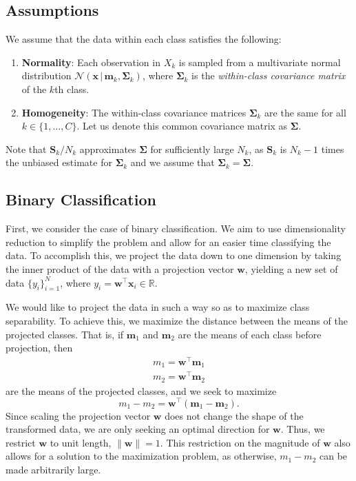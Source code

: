 \documentclass[letterpaper, 10 pt, conference]{ieeeconf}  %
\newcommand{\ve}[1]{\mathbf{#1}}
\begin{document}
\subsection{Assumptions}\label{subsec:mathform}
We assume that the data within each class satisfies the following:
\begin{enumerate}
    \item \textbf{Normality}: Each observation in $X_k$ is sampled from a multivariate normal distribution $\mathcal{N}(\ve{x}\,|\,\ve{m}_k, \ve{\Sigma}_k)$, where $\ve{\Sigma}_k$
    is the \textit{within-class covariance matrix} of the $k$th class.
    \item \textbf{Homogeneity}: The within-class covariance matrices $\ve{\Sigma}_k$ are the same for all $k \in \{1,\ldots,C\}$. Let us denote this common covariance matrix as $\ve{\Sigma}$.
\end{enumerate}
Note that $\ve{S}_k / N_k$ approximates $\ve{\Sigma}$ for sufficiently large $N_k$, as $\ve{S}_k$ is $N_k-1$ times the unbiased estimate for $\ve{\Sigma}_k$ and we assume that $\ve{\Sigma}_k = \ve{\Sigma}$.

\subsection{Binary Classification}\label{subsec:binclass}
First, we consider the case of binary classification. We aim to use dimensionality reduction to simplify the problem and allow for an easier time classifying the data. To accomplish this, we project the data down to one dimension by taking the inner product of the data with a projection vector $\ve{w}$, yielding a new set of data $\{y_i\}_{i=1}^{N}$, where $y_i=\ve{w}^\top \ve{x}_i \in \mathbb{R}$. 

We would like to project the data in such a way so as to maximize class separability. To achieve this, we maximize the distance between the means of the projected classes. 
That is, if $\ve{m}_1$ and $\ve{m}_2$ are the means of each class before projection, then 
\begin{align*}
    m_1=\ve{w}^\top \ve{m}_1 \\ m_2=\ve{w}^\top \ve{m}_2
\end{align*}
are the means of the projected classes, and we seek to maximize $$m_1-m_2=\ve{w}^\top (\ve{m}_1-\ve{m}_2).$$
Since scaling the projection vector $\ve{w}$ does not change the shape of the transformed data, we are only seeking an optimal direction for $\ve{w}$. Thus, we restrict $\ve{w}$ to unit length, $\|\ve{w}\|=1$. This restriction on the magnitude of $\ve{w}$ also allows for a solution to the maximization problem, as otherwise, $m_1-m_2$ can be made arbitrarily large.
\end{document}
